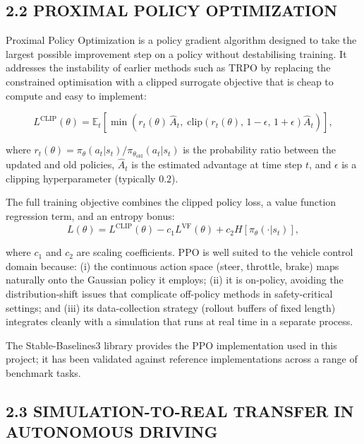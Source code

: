 \documentclass[12pt,a4paper]{article}
\begin{document}
\subsection*{2.2 \quad PROXIMAL POLICY OPTIMIZATION}

\indent Proximal Policy Optimization \cite{Schulman2017} is a policy gradient algorithm
designed to take the largest possible improvement step on a policy without
destabilising training. It addresses the instability of earlier methods such
as TRPO by replacing the constrained optimisation with a clipped surrogate
objective that is cheap to compute and easy to implement:

\begin{equation}
  L^{\text{CLIP}}(\theta) = \mathbb{E}_t \left[
    \min\!\left( r_t(\theta)\,\hat{A}_t,\;
      \text{clip}\!\left(r_t(\theta),\,1-\epsilon,\,1+\epsilon\right)\hat{A}_t
    \right)
  \right],
\end{equation}

\noindent where $r_t(\theta) = \pi_\theta(a_t|s_t) / \pi_{\theta_\text{old}}(a_t|s_t)$
is the probability ratio between the updated and old policies, $\hat{A}_t$ is
the estimated advantage at time step $t$, and $\epsilon$ is a clipping
hyperparameter (typically $0.2$).

The full training objective combines the clipped policy loss, a value function
regression term, and an entropy bonus:
\begin{equation}
  L(\theta) = L^{\text{CLIP}}(\theta)
            - c_1 L^{\text{VF}}(\theta)
            + c_2 H[\pi_\theta(\cdot|s_t)],
\end{equation}

\noindent where $c_1$ and $c_2$ are scaling coefficients. PPO is well suited to
the vehicle control domain because: (i) the continuous action space
(steer, throttle, brake) maps naturally onto the Gaussian policy it employs;
(ii) it is on-policy, avoiding the distribution-shift issues that complicate
off-policy methods in safety-critical settings; and (iii) its
data-collection strategy (rollout buffers of fixed length) integrates
cleanly with a simulation that runs at real time in a separate process.

The Stable-Baselines3 library \cite{Raffin2021} provides the PPO implementation
used in this project; it has been validated against reference implementations
across a range of benchmark tasks.

\subsection*{2.3 \quad SIMULATION-TO-REAL TRANSFER IN AUTONOMOUS DRIVING}
\end{document}
